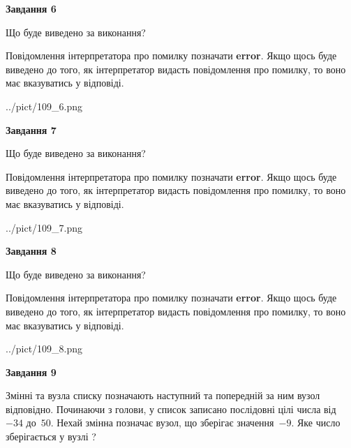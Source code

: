 \documentclass[12pt, ukrainian]{article}
\begin{document}
{\begin {large}
{\begin {center}\textbf{Завдання 6}\end {center}}\par
Що буде виведено за виконання?

Повідомлення інтерпретатора про помилку позначати \textbf{error}.
Якщо щось буде виведено до того, як інтерпретатор видасть повідомлення про помилку, 
то воно має вказуватись у відповіді. \par


\begin{center}
	{../pict/109_6.png}
\end{center}
\newpage

{\begin {center}\textbf{Завдання 7}\end {center}}\par
Що буде виведено за виконання?

Повідомлення інтерпретатора про помилку позначати \textbf{error}.
Якщо щось буде виведено до того, як інтерпретатор видасть повідомлення про помилку, 
то воно має вказуватись у відповіді. \par


\begin{center}
	{../pict/109_7.png}
\end{center}
\newpage

{\begin {center}\textbf{Завдання 8}\end {center}}\par
Що буде виведено за виконання?

Повідомлення інтерпретатора про помилку позначати \textbf{error}.
Якщо щось буде виведено до того, як інтерпретатор видасть повідомлення про помилку, 
то воно має вказуватись у відповіді. \par


\begin{center}
	{../pict/109_8.png}
\end{center}
\newpage

{\begin {center}\textbf{Завдання 9}\end {center}}\par
Змінні  та  вузла списку позначають наступний та попередній за ним вузол відповідно. Починаючи з голови, у список записано послідовні цілі числа від~$-34$ до~$50$. Нехай змінна  позначає вузол, що зберігає значення~$-9$.
Яке число зберігається у вузлі  ?\par
\newpage


\end{large}}
\end{document}
